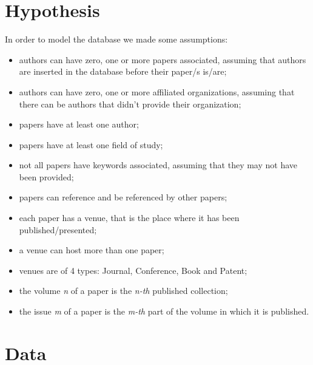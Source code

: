 \documentclass{Configuration_Files/PoliMi3i_thesis}
\begin{document}
\section{Hypothesis}
\label{se:hypo1}
In order to model the database we made some assumptions:
\begin{itemize}
    \item authors can have zero, one or more papers associated, assuming that authors are inserted in the database before their paper/s is/are;
    \item authors can have zero, one or more affiliated organizations, assuming that there can be authors that didn't provide their organization; 
    \item papers have at least one author;
    \item papers have at least one field of study;
    \item not all papers have keywords associated, assuming that they may not have been provided;
    \item papers can reference and be referenced by other papers;
    \item each paper has a venue, that is the place where it has been published/presented;
    \item a venue can host more than one paper;
    \item venues are of 4 types: Journal, Conference, Book and Patent;
    \item the volume \textit{n} of a paper is the \textit{n-th} published collection;
    \item the issue \textit{m} of a paper is the \textit{m-th} part of the volume in which it is published.
\end{itemize}
\section{Data}
\label{se:data1}
\end{document}
